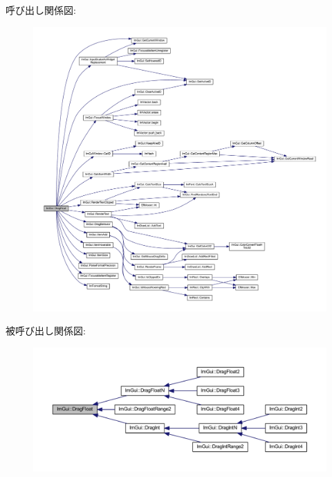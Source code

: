 呼び出し関係図\+:\nopagebreak
\begin{figure}[H]
\begin{center}
\leavevmode
\includegraphics[width=350pt]{namespace_im_gui_ac62335909eaaa63a1ead0226e836baeb_cgraph}
\end{center}
\end{figure}
被呼び出し関係図\+:\nopagebreak
\begin{figure}[H]
\begin{center}
\leavevmode
\includegraphics[width=350pt]{namespace_im_gui_ac62335909eaaa63a1ead0226e836baeb_icgraph}
\end{center}
\end{figure}
\mbox{\label{namespace_im_gui_a2852e4c3b872ed5a5d28047f0290f29c}} 

